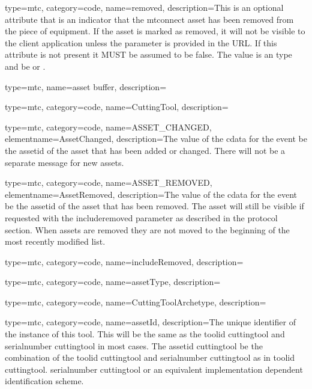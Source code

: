 {
  type=mtc,
  category=code,
  name={removed},
  description={This is an optional attribute that is an indicator that the \gls{mtconnect asset} has been removed from the piece of equipment. If the \gls{asset} is marked as removed, it will not be visible to the client application unless the  parameter is provided in the URL. If this attribute is not present it MUST be assumed to be false. The value is an  type and \MUST be  or .}
}

{
  type=mtc,
  name={asset buffer},
  description={}
}

{
  type=mtc,
  category=code,
  name={CuttingTool},
  description={}
}

{
  type=mtc,
  category=code,
  name={ASSET\_CHANGED},
  elementname={AssetChanged},
  description={The value of the \gls{cdata} for the event \MUST be the \gls{assetid} of the asset that has been added or changed. There will not be a separate message for new assets.
}
}

{
  type=mtc,
  category=code,
  name={ASSET\_REMOVED},
  elementname={AssetRemoved},
  description={The value of the \gls{cdata} for the event \MUST be the \gls{assetid} of the asset that has been removed. The asset will still be visible if requested with the \gls{includeremoved} parameter as described in the protocol section. When assets are removed they are not moved to the beginning of the most recently modified list. }
}

{
  type=mtc,
  category=code,
  name={includeRemoved},
  description={}
}

{
  type=mtc,
  category=code,
  name={assetType},
  description={}
}

{
  type=mtc,
  category=code,
  name={CuttingToolArchetype},
  description={}
}

{
  type=mtc,
  category=code,
  name={assetId},
  description={The unique identifier of the instance of this tool. This will be the same as the \gls{toolid cuttingtool} and \gls{serialnumber cuttingtool} in most cases. The \gls{assetid cuttingtool} \SHOULD be the combination of the \gls{toolid cuttingtool} and \gls{serialnumber cuttingtool} as in \gls{toolid cuttingtool}. \gls{serialnumber cuttingtool} or an equivalent implementation dependent identification scheme.}
}

